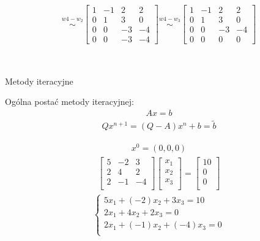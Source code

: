 \documentclass[12pt]{article}
\begin{document}
    \begin{align*}
        \stackrel{w4 - w_2}{\sim}
        \begin{bmatrix}
            1 & -1 & 2 & 2\\
            0 & 1 & 3 & 0\\
            0 & 0 & -3 & -4\\
            0 & 0 & -3 & -4
        \end{bmatrix}
        \stackrel{w4 - w_3}{\sim}
        \begin{bmatrix}
            1 & -1 & 2 & 2\\
            0 & 1 & 3 & 0\\
            0 & 0 & -3 & -4\\
            0 & 0 & 0 & 0
        \end{bmatrix}
    \end{align*}

    \hfill \\
    \begin{center}{\large Metody iteracyjne}\end{center}
    Ogólna postać metody iteracyjnej:
    \begin{align*}
        Ax = b
    \end{align*}
    \begin{align*}
        Qx^{n+1} = (Q - A)x^n + b = \tilde{b}
    \end{align*}

    \begin{align*}
        x^0 = (0,0,0)
    \end{align*}
    \begin{align*}
        \begin{bmatrix}
            5 & -2 & 3\\
            2 & 4 & 2\\
            2 & -1 & -4\\
        \end{bmatrix}
        \begin{bmatrix}
            x_1\\
            x_2\\
            x_3\\
        \end{bmatrix}
        =
        \begin{bmatrix}
            10\\
            0\\
            0\\
        \end{bmatrix}
    \end{align*}
    \begin{align*}
        \left\{\begin{matrix}
                   5x_1 + (-2)x_2 + 3x_3 = 10\\
                   2x_1 + 4x_2 + 2x_3 = 0\\
                   2x_1 + (-1)x_2 + (-4)x_3 = 0\\
        \end{matrix}\right.
    \end{align*}
\end{document}

